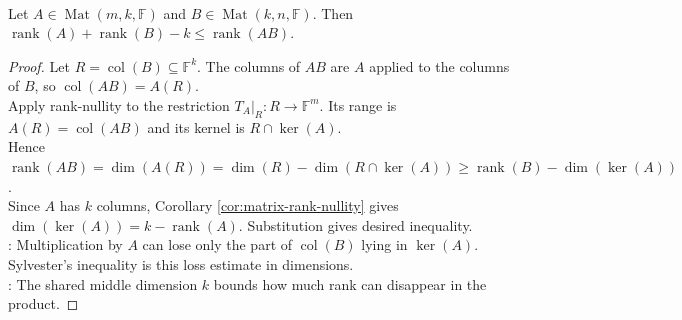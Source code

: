 \begin{theorem} \label{thm:sylvester-rank-inequality} \\
Let $A\in\operatorname{Mat}(m,k,\mathbb{F})$ and $B\in\operatorname{Mat}(k,n,\mathbb{F})$. Then $\operatorname{rank}(A)+\operatorname{rank}(B)-k\leq\operatorname{rank}(AB)$.
\begin{proof}
Let $R=\operatorname{col}(B)\subseteq\mathbb{F}^k$. The columns of $AB$ are $A$ applied to the columns of $B$, so $\operatorname{col}(AB)=A(R)$.\\
Apply rank-nullity to the restriction $T_A|_R:R\to\mathbb{F}^m$. Its range is $A(R)=\operatorname{col}(AB)$ and its kernel is $R\cap\ker(A)$.\\
Hence $\operatorname{rank}(AB) =\dim(A(R)) =\dim(R)-\dim(R\cap\ker(A)) \geq \operatorname{rank}(B)-\dim(\ker(A))$.\\
Since $A$ has $k$ columns, Corollary \ref{cor:matrix-rank-nullity} gives $\dim(\ker(A))=k-\operatorname{rank}(A)$. Substitution gives desired inequality.\\
: Multiplication by $A$ can lose only the part of $\operatorname{col}(B)$ lying in $\ker(A)$. Sylvester's inequality is this loss estimate in dimensions.\\
: The shared middle dimension $k$ bounds how much rank can disappear in the product.
\end{proof}
\end{theorem}

